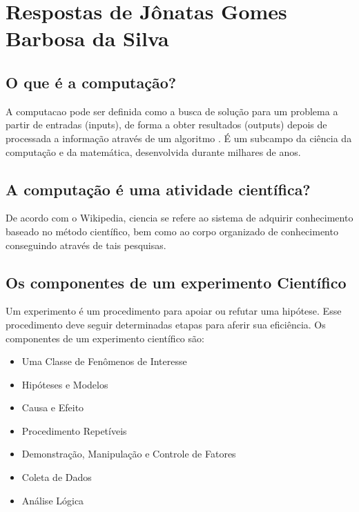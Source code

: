 \section{Respostas de Jônatas Gomes Barbosa da Silva}

\subsection{O que é a computação?}
A \gls{computacao} pode ser definida como a busca de solução para um problema a partir de entradas (inputs), de forma a obter resultados (outputs) depois de processada a informação através de um algoritmo \citet{wikipedia_computacao_2022}. É um subcampo da ciência da computação e da matemática, desenvolvida durante milhares de anos.

\subsection{A computação é uma atividade científica?}
De acordo com o Wikipedia, \gls{ciencia} se refere ao sistema de adquirir conhecimento baseado no método científico, bem como ao corpo organizado de conhecimento conseguindo através de tais pesquisas. \cite{wikipedia_ciencia_2022}
    

\subsection{Os componentes de um experimento Científico}
Um \gls{experimento} é um procedimento para apoiar ou refutar uma hipótese. Esse procedimento deve seguir determinadas etapas para aferir sua eficiência. Os componentes de um experimento científico são:
\begin{itemize}
    \item Uma Classe de Fenômenos de Interesse
    \item Hipóteses e Modelos
    \item Causa e Efeito
    \item Procedimento Repetíveis
    \item Demonstração, Manipulação e Controle de Fatores
    \item Coleta de Dados
    \item Análise Lógica
\end{itemize}
